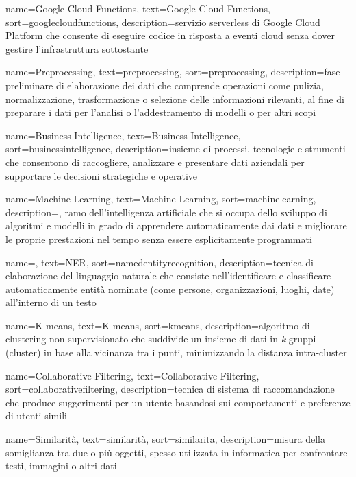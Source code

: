  {
    name=Google Cloud Functions,
    text=Google Cloud Functions,
    sort=googlecloudfunctions,
    description={servizio serverless di Google Cloud Platform che consente di eseguire codice in risposta a eventi cloud senza dover gestire l'infrastruttura sottostante}
}

 {
    name=Preprocessing,
    text=preprocessing,
    sort=preprocessing,
    description={fase preliminare di elaborazione dei dati che comprende operazioni come pulizia, normalizzazione, trasformazione o selezione delle informazioni rilevanti, al fine di preparare i dati per l'analisi o l'addestramento di modelli o per altri scopi}
}

 {
    name=Business Intelligence,
    text=Business Intelligence,
    sort=businessintelligence,
    description={insieme di processi, tecnologie e strumenti che consentono di raccogliere, analizzare e presentare dati aziendali per supportare le decisioni strategiche e operative}
}

 {
    name=Machine Learning,
    text=Machine Learning,
    sort=machinelearning,
    description={, ramo dell'intelligenza artificiale che si occupa dello sviluppo di algoritmi e modelli in grado di apprendere automaticamente dai dati e migliorare le proprie prestazioni nel tempo senza essere esplicitamente programmati}
}

 {
    name=,
    text=NER,
    sort=namedentityrecognition,
    description={tecnica di elaborazione del linguaggio naturale che consiste nell'identificare e classificare automaticamente entità nominate (come persone, organizzazioni, luoghi, date) all'interno di un testo}
}

 {
    name=K-means,
    text=K-means,
    sort=kmeans,
    description={algoritmo di clustering non supervisionato che suddivide un insieme di dati in \emph{k} gruppi (cluster) in base alla vicinanza tra i punti, minimizzando la distanza intra-cluster}
}

 {
    name=Collaborative Filtering,
    text=Collaborative Filtering,
    sort=collaborativefiltering,
    description={tecnica di sistema di raccomandazione che produce suggerimenti per un utente basandosi sui comportamenti e preferenze di utenti simili}
}

 {
    name=Similarità,
    text=similarità,
    sort=similarita,
    description={misura della somiglianza tra due o più oggetti, spesso utilizzata in informatica per confrontare testi, immagini o altri dati}
}

